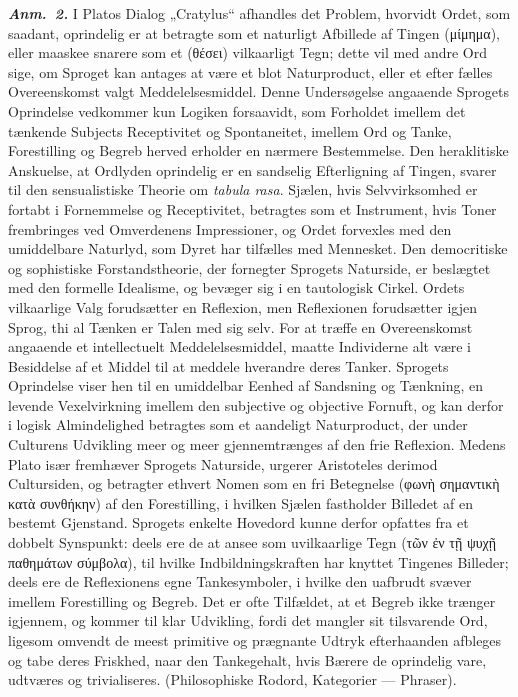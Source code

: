 \documentclass[12pt]{book}
\newcommand{\anm}[1]{\emph{\textbf{Anm.~#1.}}}
\newcommand{\opage}[1]{\marginnote{\footnotesize\textit{[#1]}}}
\begin{document}
\anm{2} I Platos Dialog „Cratylus“ afhandles det Problem, hvorvidt Ordet, som
saadant, oprindelig er at betragte som et naturligt Afbillede af Tingen
(μίμημα), eller maaskee snarere som et (θέσει) vilkaarligt Tegn; dette vil med
andre Ord sige, om Sproget kan antages at være et blot Naturproduct, eller et
efter fælles Overeenskomst valgt Meddelelsesmiddel. Denne Undersøgelse angaaende
Sprogets Oprindelse vedkommer kun Logiken forsaavidt, som Forholdet imellem det
tænkende Subjects Receptivitet og Spontaneitet, imellem Ord og Tanke,
Forestilling og Begreb herved erholder en nærmere Bestemmelse. Den heraklitiske
Anskuelse, at Ordlyden oprindelig er en sandselig Efterligning af Tingen, svarer
til den sensualistiske Theorie om \textit{tabula rasa}. Sjælen, hvis
Selvvirksomhed er fortabt i Fornemmelse og Receptivitet, betragtes som et
Instrument, hvis Toner frembringes ved Omverdenens Impressioner, og Ordet
forvexles
\opage{38} med den umiddelbare Naturlyd, som Dyret har tilfælles med Mennesket. Den
democritiske og sophistiske Forstandstheorie, der fornegter Sprogets Naturside,
er beslægtet med den formelle Idealisme, og bevæger sig i en tautologisk Cirkel.
Ordets vilkaarlige Valg forudsætter en Reflexion, men Reflexionen forudsætter
igjen Sprog, thi al Tænken er Talen med sig selv. For at træffe en
Overeenskomst angaaende et intellectuelt Meddelelsesmiddel, maatte Individerne
alt være i Besiddelse af et Middel til at meddele hverandre deres Tanker.
Sprogets Oprindelse viser hen til en umiddelbar Eenhed af Sandsning og Tænkning,
en levende Vexelvirkning imellem den subjective og objective Fornuft, og kan
derfor i logisk Almindelighed betragtes som et aandeligt Naturproduct, der under
Culturens Udvikling meer og meer gjennemtrænges af den frie Reflexion. Medens
Plato især fremhæver Sprogets Naturside, urgerer Aristoteles derimod
Cultursiden, og betragter ethvert Nomen som en fri Betegnelse (φωνὴ σημαντικὴ
κατὰ συνθήκην) af den Forestilling, i hvilken Sjælen fastholder Billedet af en
bestemt Gjenstand. Sprogets enkelte Hovedord kunne derfor opfattes fra et dobbelt
Synspunkt: deels ere de at ansee som uvilkaarlige Tegn (τῶν ἐν τῇ ψυχῇ
παθημάτων σύμβολα), til hvilke Indbildningskraften har knyttet Tingenes Billeder;
deels ere de Reflexionens egne Tankesymboler, i hvilke den uafbrudt svæver
imellem Forestilling og Begreb. Det er ofte Tilfældet, at et Begreb ikke trænger
igjennem, og kommer til klar Udvikling, fordi det mangler sit tilsvarende Ord,
ligesom omvendt de meest primitive og prægnante Udtryk efterhaanden afbleges og
tabe deres Friskhed, naar den Tankegehalt, hvis Bærere de oprindelig vare,
udtværes og trivialiseres. (Philosophiske Rodord, Kategorier --- Phraser).
\end{document}
